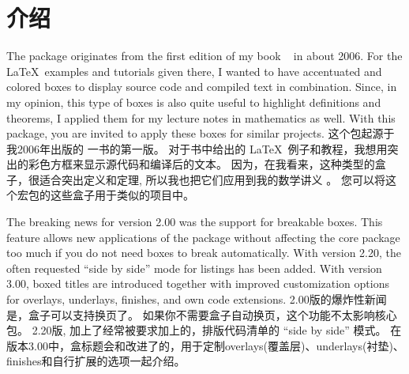 \section{介绍}%
%

\begin{stripedbox}
The package originates from %
the first edition of my book %
\frqq~%
in about 2006.%
For the \LaTeX\ examples and tutorials given there, %
I wanted to have accentuated and colored boxes to display source code and
compiled text in combination.%
Since, in my opinion, %
this type of boxes is also quite useful to highlight definitions and theorems,%
I applied them for my lecture notes in mathematics %
as well.%
With this package, you are invited to apply these boxes for similar projects.
\tcblower
这个包起源于我2006年出版的%
\frqq%
一书的第一版。%
对于书中给出的 \LaTeX\ 例子和教程，我想用突出的彩色方框来显示源代码和编译后的文本。%
因为，在我看来，这种类型的盒子，很适合突出定义和定理, 所以我也把它们应用到我的数学讲义 %
。%
您可以将这个宏包的这些盒子用于类似的项目中。
\end{stripedbox}




\begin{stripedbox}
The breaking news for version 2.00 was the support for breakable boxes.%
This feature allows new applications of the package without affecting the core package too much if you do not need boxes to break automatically.%
With version 2.20, the often requested \enquote{side by side} mode for listings has been added.%
With version 3.00, boxed titles are introduced together with improved customization options for overlays, underlays, finishes, and own code extensions.%
\tcblower
2.00版的爆炸性新闻是，盒子可以支持换页了。%
如果你不需要盒子自动换页，这个功能不太影响核心包。%
2.20版, 加上了经常被要求加上的，排版代码清单的 \enquote{side by side} 模式。%
在版本3.00中，盒标题会和改进了的，用于定制overlays(覆盖层)、underlays(衬垫)、finishes和自行扩展的选项一起介绍。
\end{stripedbox}

